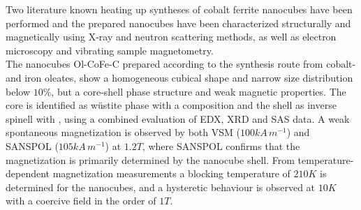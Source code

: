 \documentclass[\main/dresen_thesis.tex]{subfiles}
\begin{document}
  \label{sec:monolayers:nanoparticle:discussion:summary}
  Two literature known heating up syntheses of cobalt ferrite nanocubes have been performed and the prepared nanocubes have been characterized structurally and magnetically using X-ray and neutron scattering methods, as well as electron microscopy and vibrating sample magnetometry.
  \\

  The nanocubes Ol-CoFe-C prepared according to the synthesis route from cobalt- and iron oleates, show a homogeneous cubical shape and narrow size distribution below $10 \%$, but a core-shell phase structure and weak magnetic properties.
  The core is identified as w\"ustite phase with a  composition and the shell as inverse spinell with , using a combined evaluation of EDX, XRD and SAS data.
  A weak spontaneous magnetization is observed by both VSM ($100 \unit{kA \, m^{-1}}$) and SANSPOL ($105 \unit{kA \, m^{-1}}$) at $1.2 \unit{T}$, where SANSPOL confirms that the magnetization is primarily determined by the nanocube shell.
  From temperature-dependent magnetization measurements a blocking temperature of $210 \unit{K}$ is determined for the nanocubes, and a hysteretic behaviour is observed at $10 \unit{K}$ with a coercive field in the order of $1 \unit{T}$.
  \\
\end{document}
